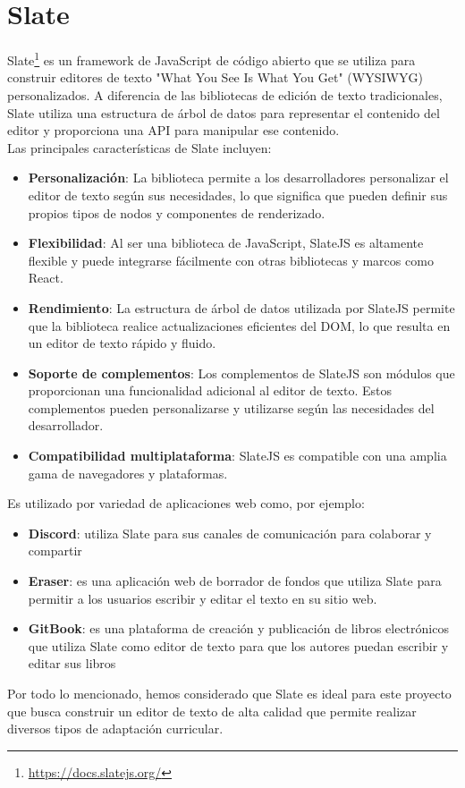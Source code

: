 
\section{Slate}\label{sec:Slate}
Slate\footnote{\url{https://docs.slatejs.org/}} es un framework de JavaScript de código abierto que se utiliza para construir editores de texto "What You See Is What You Get" (WYSIWYG) personalizados. A diferencia de las bibliotecas de edición de texto tradicionales, Slate utiliza una estructura de árbol de datos para representar el contenido del editor y proporciona una API para manipular ese contenido.
\\
Las principales características de Slate incluyen:
\begin{itemize}
    \item \textbf{Personalización}: La biblioteca permite a los desarrolladores personalizar el editor de texto según sus necesidades, lo que significa que pueden definir sus propios tipos de nodos y componentes de renderizado.
    \item \textbf{Flexibilidad}: Al ser una biblioteca de JavaScript, SlateJS es altamente flexible y puede integrarse fácilmente con otras bibliotecas y marcos como React.
    \item \textbf{Rendimiento}: La estructura de árbol de datos utilizada por SlateJS permite que la biblioteca realice actualizaciones eficientes del DOM, lo que resulta en un editor de texto rápido y fluido.
    \item \textbf{Soporte de complementos}: Los complementos de SlateJS son módulos que proporcionan una funcionalidad adicional al editor de texto. Estos complementos pueden personalizarse y utilizarse según las necesidades del desarrollador.
    \item \textbf{Compatibilidad multiplataforma}: SlateJS es compatible con una amplia gama de navegadores y plataformas. 
\end{itemize}
Es utilizado por variedad de aplicaciones web como, por ejemplo:
\begin{itemize}
    \item \textbf{Discord}: utiliza Slate para sus canales de comunicación para colaborar y compartir
    \item \textbf{Eraser}: es una aplicación web de borrador de fondos que utiliza Slate para permitir a los usuarios escribir y editar el texto en su sitio web.
    \item \textbf{GitBook}: es una plataforma de creación y publicación de libros electrónicos que utiliza Slate como editor de texto para que los autores puedan escribir y editar sus libros
    
\end{itemize}
Por todo lo mencionado, hemos considerado que Slate es ideal para este proyecto que busca construir un editor de texto de alta calidad que permite realizar diversos tipos de adaptación curricular.



